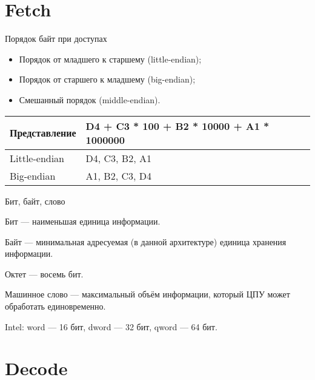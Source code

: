 \section{Fetch}

\begin{frame}{Порядок байт при доступах}

\begin{itemize}
    \item Порядок от младшего к старшему (\abbr little-endian);
    \item Порядок от старшего к младшему (\abbr big-endian);
    \item Смешанный порядок (\abbr middle-endian).
\end{itemize}

\pause

\begin{table}[htpb]
    \centering
    \begin{tabular}{|l|l|}
    \hline
    Представление   &   D4 + C3 * 100 + B2 * 10000 + A1 * 1000000   \\
    \hline
    Little-endian   &   D4, C3, B2, A1                              \\
    \hline
    Big-endian      &   A1, B2, C3, D4                              \\
    \hline
    \end{tabular}
\end{table}

\end{frame}

\begin{frame}{Бит, байт, слово}

Бит \pause --- наименьшая единица информации.

\bigskip
\pause

Байт \pause --- минимальная адресуемая (в данной архитектуре) единица хранения
информации.

\bigskip
\pause

Октет --- восемь бит.

\bigskip
\pause

Машинное слово \pause --- максимальный объём информации, который ЦПУ может
обработать единовременно.

\bigskip
\pause

Intel: word — 16 бит, dword — 32 бит, qword — 64 бит.

\end{frame}

\section{Decode}

